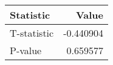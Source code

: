 \begin{tabular}{lr}
\toprule
Statistic & Value \\
\midrule
T-statistic & -0.440904 \\
P-value & 0.659577 \\
\bottomrule
\end{tabular}
